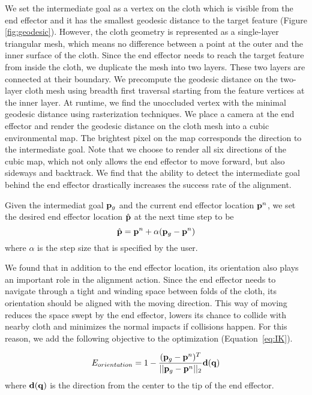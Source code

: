 We set the intermediate goal as a vertex on the cloth which is visible from the end effector and it has the smallest geodesic distance to the target feature (Figure \ref{fig:geodesic}). However, the cloth geometry is represented as a single-layer triangular mesh, which means no difference between a point at the outer and the inner surface of the cloth. Since the end effector needs to reach the target feature from inside the cloth, we duplicate the mesh into two layers. These two layers are connected at their boundary. We precompute the geodesic distance on the two-layer cloth mesh using breadth first traversal starting from the feature vertices at the inner layer. At runtime, we find the unoccluded vertex with the minimal geodesic distance using rasterization techniques. We place a camera at the end effector and render the geodesic distance on the cloth mesh into a cubic environmental map. The brightest pixel on the map corresponds the direction to the intermediate goal. Note that we choose to render all six directions of the cubic map, which not only allows the end effector to move forward, but also sideways and backtrack. We find that the ability to detect the intermediate goal behind the end effector drastically increases the success rate of the alignment.

Given the intermediat goal $\mathbf{p}_g$ and the current end effector location $\mathbf{p}^n$, we set the desired end effector location $\hat{\mathbf{p}}$ at the next time step to be 
\begin{equation}
  \hat{\mathbf{p}} = \mathbf{p}^n+\alpha(\mathbf{p}_g - \mathbf{p}^n)
  \label{eq:target}
\end{equation}
where $\alpha$ is the step size that is specified by the user.

We found that in addition to the end effector location, its orientation also plays an important role in the alignment action. Since the end effector needs to navigate through a tight and winding space between folds of the cloth, its orientation should be aligned with the moving direction. This way of moving reduces the space swept by the end effector, lowers its chance to collide with nearby cloth and minimizes the normal impacts if collisions happen. For this reason, we add the following objective to the optimization (Equation~\ref{eq:IK}).

\begin{displaymath}
E_{orientation} = 1-\frac{(\mathbf{p}_g-\mathbf{p}^n)^T}{||\mathbf{p}_g-\mathbf{p}^n||_2}\mathbf{d(q})
\end{displaymath}
where $\mathbf{d(q)}$ is the direction from the center to the tip of the end effector.

